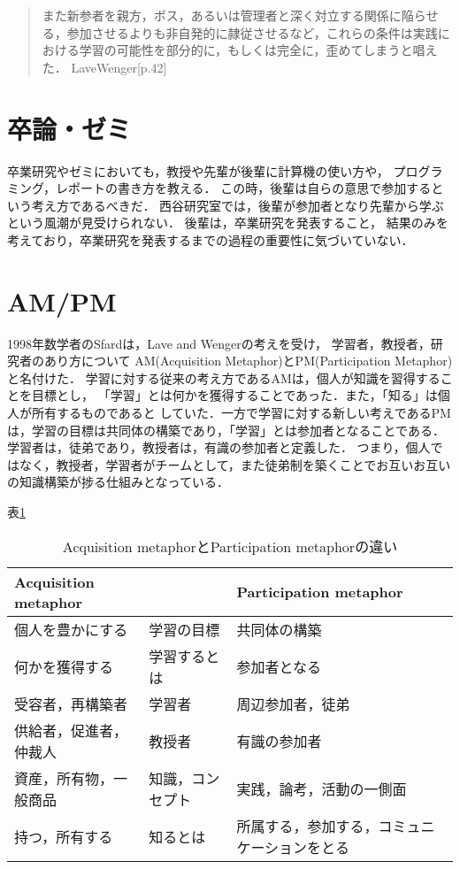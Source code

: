 \documentclass{hissymp}
\begin{document}
\begin{quote}
また新参者を親方，ボス，あるいは管理者と深く対立する関係に陥らせる，参加させるよりも非自発的に隷従させるなど，これらの条件は実践における学習の可能性を部分的に，もしくは完全に，歪めてしまうと唱えた．
  LaveWenger[p.42]
\end{quote}

\section{卒論・ゼミ}
\label{sec:org27b0fd8}
卒業研究やゼミにおいても，教授や先輩が後輩に計算機の使い方や，
プログラミング，レポートの書き方を教える．
この時，後輩は自らの意思で参加するという考え方であるべきだ．
西谷研究室では，後輩が参加者となり先輩から学ぶという風潮が見受けられない．
後輩は，卒業研究を発表すること，
結果のみを考えており，卒業研究を発表するまでの過程の重要性に気づいていない．

\section{AM/PM}
\label{sec:orgb194082}

1998年数学者のSfardは，Lave and Wengerの考えを受け，
学習者，教授者，研究者のあり方について
AM(Acquisition Metaphor)とPM(Participation Metaphor)と名付けた．
学習に対する従来の考え方であるAMは，個人が知識を習得することを目標とし，
「学習」とは何かを獲得することであった．また，「知る」は個人が所有するものであると
していた．一方で学習に対する新しい考えであるPMは，学習の目標は共同体の構築であり，「学習」とは参加者となることである．学習者は，徒弟であり，教授者は，有識の参加者と定義した．
つまり，個人ではなく，教授者，学習者がチームとして，また徒弟制を築くことでお互いお互いの知識構築が捗る仕組みとなっている．

表\ref{tab:org9c2c4d0}

\begin{table}[htbp]
\caption{\label{tab:org9c2c4d0}
Acquisition metaphorとParticipation metaphorの違い}
\centering
\begin{tabular}{|l|l|l|}
\hline
Acquisition metaphor &  & Participation metaphor\\
\hline
個人を豊かにする & 学習の目標 & 共同体の構築\\
何かを獲得する & 学習するとは & 参加者となる\\
受容者，再構築者 & 学習者 & 周辺参加者，徒弟\\
供給者，促進者，仲裁人 & 教授者 & 有識の参加者\\
資産，所有物，一般商品 & 知識，コンセプト & 実践，論考，活動の一側面\\
持つ，所有する & 知るとは & 所属する，参加する，コミュニケーションをとる\\
\hline
\end{tabular}
\end{table}
\end{document}
